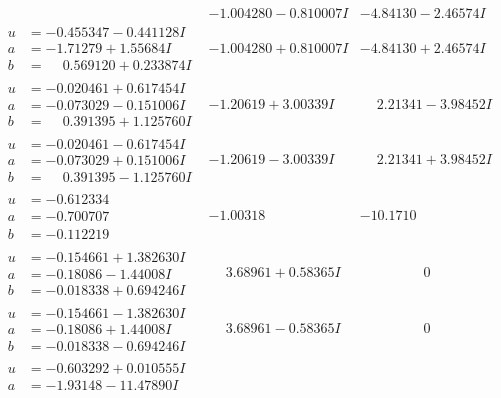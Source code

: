 \documentclass[1p]{elsarticle_modified}
\theoremstyle{definition}
\begin{document}
$$\begin{array}{c|c|c}
 & -1.004280 - 0.810007 I & -4.84130 - 2.46574 I \\ \hline\begin{aligned}
u &= -0.455347 - 0.441128 I \\
a &= -1.71279 + 1.55684 I \\
b &= \phantom{-}0.569120 + 0.233874 I\end{aligned}
 & -1.004280 + 0.810007 I & -4.84130 + 2.46574 I \\ \hline\begin{aligned}
u &= -0.020461 + 0.617454 I \\
a &= -0.073029 - 0.151006 I \\
b &= \phantom{-}0.391395 + 1.125760 I\end{aligned}
 & -1.20619 + 3.00339 I & \phantom{-}2.21341 - 3.98452 I \\ \hline\begin{aligned}
u &= -0.020461 - 0.617454 I \\
a &= -0.073029 + 0.151006 I \\
b &= \phantom{-}0.391395 - 1.125760 I\end{aligned}
 & -1.20619 - 3.00339 I & \phantom{-}2.21341 + 3.98452 I \\ \hline\begin{aligned}
u &= -0.612334\phantom{ +0.000000I} \\
a &= -0.700707\phantom{ +0.000000I} \\
b &= -0.112219\phantom{ +0.000000I}\end{aligned}
 & -1.00318\phantom{ +0.000000I} & -10.1710\phantom{ +0.000000I} \\ \hline\begin{aligned}
u &= -0.154661 + 1.382630 I \\
a &= -0.18086 - 1.44008 I \\
b &= -0.018338 + 0.694246 I\end{aligned}
 & \phantom{-}3.68961 + 0.58365 I & \phantom{-0.000000 } 0 \\ \hline\begin{aligned}
u &= -0.154661 - 1.382630 I \\
a &= -0.18086 + 1.44008 I \\
b &= -0.018338 - 0.694246 I\end{aligned}
 & \phantom{-}3.68961 - 0.58365 I & \phantom{-0.000000 } 0 \\ \hline\begin{aligned}
u &= -0.603292 + 0.010555 I \\
a &= -1.93148 - 11.47890 I \\

\end{aligned}
\end{array}$$
\end{document}

